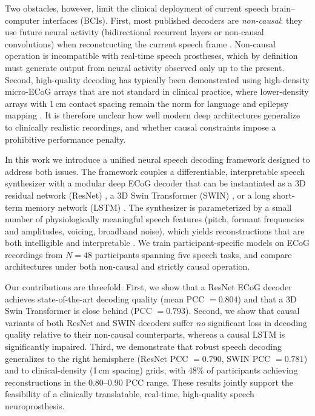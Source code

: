 \documentclass[11pt]{article}
\begin{document}
Two obstacles, however, limit the clinical deployment of current speech brain--computer interfaces (BCIs). First, most published decoders are \emph{non-causal}: they use future neural activity (bidirectional recurrent layers or non-causal convolutions) when reconstructing the current speech frame \cite{anumanchipalli2019speech,makin2020machine}. Non-causal operation is incompatible with real-time speech prostheses, which by definition must generate output from neural activity observed only up to the present. Second, high-quality decoding has typically been demonstrated using high-density micro-ECoG arrays that are not standard in clinical practice, where lower-density arrays with 1\,cm contact spacing remain the norm for language and epilepsy mapping \cite{crone1998functional,bouchard2013functional,chartier2018encoding}. It is therefore unclear how well modern deep architectures generalize to clinically realistic recordings, and whether causal constraints impose a prohibitive performance penalty.

In this work we introduce a unified neural speech decoding framework designed to address both issues. The framework couples a differentiable, interpretable speech synthesizer with a modular deep ECoG decoder that can be instantiated as a 3D residual network (ResNet) \cite{he2016deep}, a 3D Swin Transformer (SWIN) \cite{liu2021swin,liu2022video}, or a long short-term memory network (LSTM) \cite{hochreiter1997long}. The synthesizer is parameterized by a small number of physiologically meaningful speech features (pitch, formant frequencies and amplitudes, voicing, broadband noise), which yields reconstructions that are both intelligible and interpretable \cite{flanagan1980parametric,rabiner1978digital}. We train participant-specific models on ECoG recordings from $N=48$ participants spanning five speech tasks, and compare architectures under both non-causal and strictly causal operation.

Our contributions are threefold. First, we show that a ResNet ECoG decoder achieves state-of-the-art decoding quality (mean PCC $= 0.804$) and that a 3D Swin Transformer is close behind (PCC $= 0.793$). Second, we show that causal variants of both ResNet and SWIN decoders suffer \emph{no} significant loss in decoding quality relative to their non-causal counterparts, whereas a causal LSTM is significantly impaired. Third, we demonstrate that robust speech decoding generalizes to the right hemisphere (ResNet PCC $= 0.790$, SWIN PCC $= 0.781$) and to clinical-density (1\,cm spacing) grids, with 48\% of participants achieving reconstructions in the 0.80--0.90 PCC range. These results jointly support the feasibility of a clinically translatable, real-time, high-quality speech neuroprosthesis.
\end{document}
